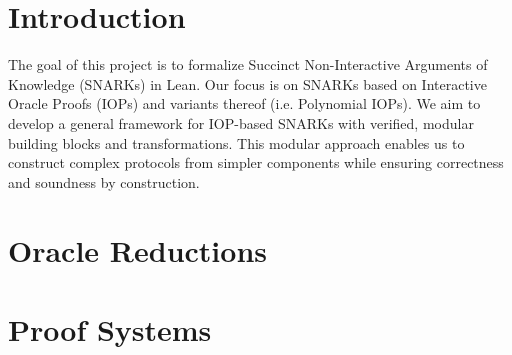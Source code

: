 %

\chapter{Introduction}

The goal of this project is to formalize Succinct Non-Interactive Arguments of Knowledge (SNARKs) in
Lean. Our focus is on SNARKs based on Interactive Oracle Proofs (IOPs) and variants thereof (i.e.
Polynomial IOPs). We aim to develop a general framework for IOP-based SNARKs with verified, modular
building blocks and transformations. This modular approach enables us to construct complex protocols
from simpler components while ensuring correctness and soundness by construction.

\chapter{Oracle Reductions}\label{chap:oracle_reductions}







\chapter{Proof Systems}\label{chap:proof_systems}













